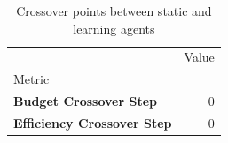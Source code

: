 \begin{table}
\caption{Crossover points between static and learning agents}
\label{tab:crossover}
\begin{tabular}{lr}
\toprule
 & Value \\
Metric &  \\
\midrule
\textbf{Budget Crossover Step} & 0 \\
\textbf{Efficiency Crossover Step} & 0 \\
\bottomrule
\end{tabular}
\end{table}
